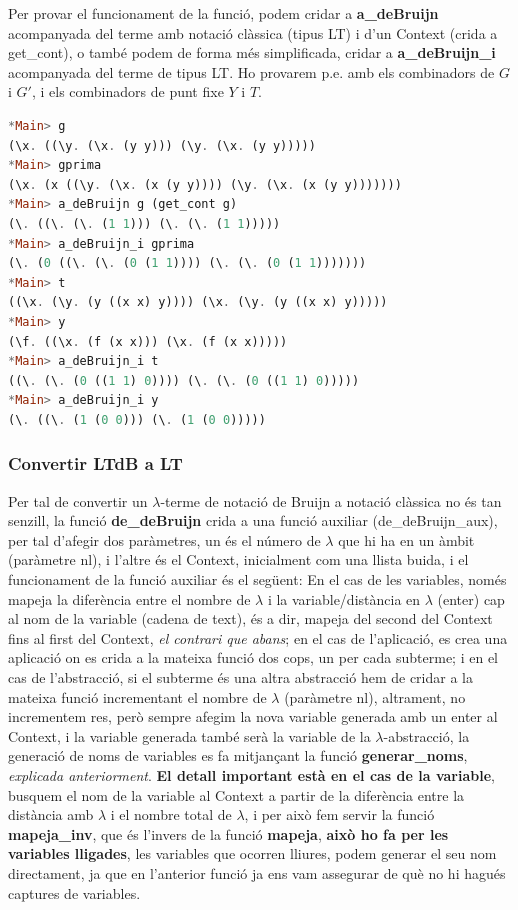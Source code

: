 \documentclass[10pt,a4paper]{article}
\begin{document}
Per provar el funcionament de la funció, podem cridar a \textbf{a\_deBruijn} acompanyada del terme amb notació clàssica (tipus LT) i d'un Context (crida a get\_cont), o també podem de forma més simplificada, cridar a \textbf{a\_deBruijn\_i} acompanyada del terme de tipus LT. Ho provarem p.e. amb els combinadors de $G$ i $G'$, i els combinadors de punt fixe $Y$ i $T$. 

\begin{lstlisting}[language=Haskell]
*Main> g
(\x. ((\y. (\x. (y y))) (\y. (\x. (y y)))))
*Main> gprima
(\x. (x ((\y. (\x. (x (y y)))) (\y. (\x. (x (y y)))))))
*Main> a_deBruijn g (get_cont g)
(\. ((\. (\. (1 1))) (\. (\. (1 1)))))
*Main> a_deBruijn_i gprima
(\. (0 ((\. (\. (0 (1 1)))) (\. (\. (0 (1 1)))))))
*Main> t
((\x. (\y. (y ((x x) y)))) (\x. (\y. (y ((x x) y)))))
*Main> y
(\f. ((\x. (f (x x))) (\x. (f (x x)))))
*Main> a_deBruijn_i t
((\. (\. (0 ((1 1) 0)))) (\. (\. (0 ((1 1) 0)))))
*Main> a_deBruijn_i y
(\. ((\. (1 (0 0))) (\. (1 (0 0)))))
\end{lstlisting}

\clearpage

\subsubsection*{Convertir LTdB a LT}

Per tal de convertir un $\lambda$-terme de notació de Bruijn a notació clàssica no és tan senzill, la funció \textbf{de\_deBruijn} crida a una funció auxiliar (de\_deBruijn\_aux), per tal d'afegir dos paràmetres, un és el número de $\lambda$ que hi ha en un àmbit (paràmetre nl), i l'altre és el Context, inicialment com una llista buida, i el funcionament de la funció auxiliar és el següent: En el cas de les variables, només mapeja la diferència entre el nombre de $\lambda$ i la variable/distància en $\lambda$ (enter) cap al nom de la variable (cadena de text), és a dir, mapeja del second del Context fins al first del Context, \textit{el contrari que abans}; en el cas de l'aplicació, es crea una aplicació on es crida a la mateixa funció dos cops, un per cada subterme; i en el cas de l'abstracció, si el subterme és una altra abstracció hem de cridar a la mateixa funció incrementant el nombre de $\lambda$ (paràmetre nl), altrament, no incrementem res, però sempre afegim la nova variable generada amb un enter al Context, i la variable generada també serà la variable de la $\lambda$-abstracció, la generació de noms de variables es fa mitjançant la funció \textbf{generar\_noms}, \textit{explicada anteriorment}. \textbf{El detall important està en el cas de la variable}, busquem el nom de la variable al Context a partir de la diferència entre la distància amb $\lambda$ i el nombre total de $\lambda$, i per això fem servir la funció \textbf{mapeja\_inv}, que és l'invers de la funció \textbf{mapeja}, \textbf{això ho fa per les variables lligades}, les variables que ocorren lliures, podem generar el seu nom directament, ja que en l'anterior funció ja ens vam assegurar de què no hi hagués captures de variables.
\end{document}
